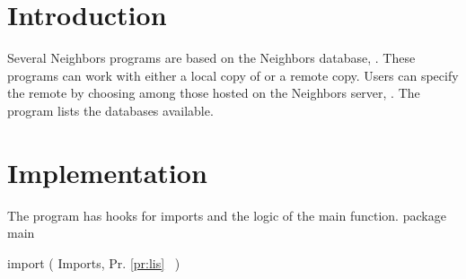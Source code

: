 \nwfilename{}\nwenddocs{}\nwdocspar%
\section*{Introduction}
Several Neighbors programs are based on the Neighbors database, .
These programs can work with either a local copy of  or a remote 
copy. Users can specify the remote  by choosing among those hosted
on the Neighbors server, . The program  lists the
databases available.

\section*{Implementation}
The program  has hooks for imports and the logic of the main
function.
\nwenddocs{}\endmoddef\nwstartdeflinemarkup\nwenddeflinemarkup
package main

import (
          \LA{}Imports, Pr. \ref{pr:lis}~{\nwtagstyle{}}\RA{}
)

